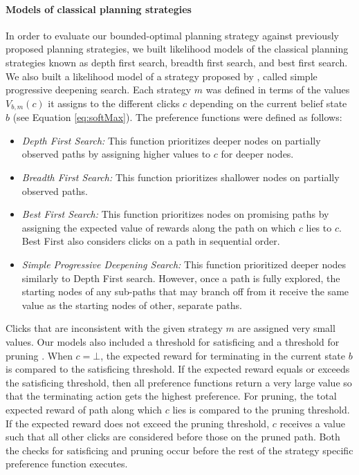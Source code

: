 \paragraph{Models of classical planning strategies}
In order to evaluate our bounded-optimal planning strategy against previously proposed planning strategies, we built likelihood models of the classical planning strategies known as depth first search, breadth first search, and best first search. We also built a likelihood model of a strategy proposed by \citet{NewellSimon1972a}, called simple progressive deepening search. Each strategy $m$ was defined in terms of the values $V_{b,m}(c)$ it assigns to the different clicks $c$ depending on the current belief state $b$ (see Equation \ref{eq:softMax}). The preference functions were defined as follows:
\begin{itemize}
    \item \textit{Depth First Search:} This function prioritizes deeper nodes on partially observed paths by assigning higher values to $c$ for deeper nodes. 
    \item \textit{Breadth First Search:} This function prioritizes shallower nodes on partially observed paths. 
    \item \textit{Best First Search:} This function prioritizes nodes on promising paths by assigning the expected value of rewards along the path on which $c$ lies to $c$. Best First also considers clicks on a path in sequential order. 
    \item \textit{Simple Progressive Deepening Search:} This function prioritized deeper nodes similarly to Depth First search. However, once a path is fully explored, the starting nodes of any sub-paths that may branch off from it receive the same value as the starting nodes of other, separate paths.
\end{itemize}
Clicks that are inconsistent with the given strategy $m$ are assigned very small values. Our models also included a threshold for satisficing \cite{Simon1956} and a threshold for pruning \cite{Huys2012}. When $c = \bot$, the expected reward for terminating in the current state $b$ is compared to the satisficing threshold. If the expected reward equals or exceeds the satisficing threshold, then all preference functions return a very large value so that the terminating action gets the highest preference. For pruning, the total expected reward of path along which $c$ lies is compared to the pruning threshold. If the expected reward does not exceed the pruning threshold, $c$ receives a value such that all other clicks are considered before those on the pruned path. Both the checks for satisficing and pruning occur before the rest of the strategy specific preference function executes.



